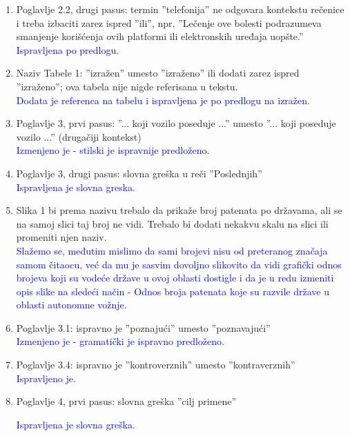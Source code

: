 \documentclass[a4paper]{report}
\newcommand{\odgovor}[1]{\textcolor{blue}{#1}}
\begin{document}
\begin{enumerate}
\item Poglavlje 2.2, drugi pasus: termin ''telefonija'' ne odgovara kontekstu rečenice i treba izbaciti zarez ispred ''ili'', npr. ''Lečenje ove bolesti podrazumeva smanjenje
korišćenja ovih platformi ili elektronskih uređaja uopšte.'' \\
\odgovor{Ispravljena po predlogu.}

\item Naziv Tabele 1: ''izražen'' umesto ''izraženo'' ili dodati zarez ispred ''izraženo''; ova tabela nije nigde referisana u tekstu. \\
\odgovor{Dodata je referenca na tabelu i ispravljena je po predlogu na izražen.}

\item Poglavlje 3, prvi pasus: ''... koji vozilo poseduje ...'' umesto ''... koji poseduje vozilo ...'' (drugačiji kontekst) \\
\odgovor{Izmenjeno je - stilski je ispravnije predloženo.}

\item Poglavlje 3, drugi pasus: slovna greška u reči ''Poslednjih'' \\
\odgovor{Ispravljena je slovna greska.}

\item Slika 1 bi prema nazivu trebalo da prikaže broj patenata po državama, ali se na samoj slici taj broj ne vidi. Trebalo bi dodati nekakvu skalu na slici ili promeniti njen naziv. \\
\odgovor{Slažemo se, međutim mislimo da sami brojevi nisu od preteranog značaja samom čitaocu, već da mu je sasvim dovoljno slikovito da vidi grafički odnos brojeva koji su vodeće države u ovoj oblasti dostigle i da je u redu izmeniti opis slike na sledeći način -  Odnos broja patenata koje su razvile države u oblasti autonomne vožnje.}

\item Poglavlje 3.1: ispravno je ''poznajući'' umesto ''poznavajući'' \\
\odgovor{Izmenjeno je - gramatički je ispravno predloženo.} 

\item Poglavlje 3.4: ispravno je ''kontroverznih'' umesto ''kontraverznih'' \\
\odgovor{Ispravljeno je.}

\item Poglavlje 4, prvi pasus: slovna greška ''cilj primene''

\odgovor{Ispravljena je slovna greška.} 


\end{enumerate}
\end{document}
